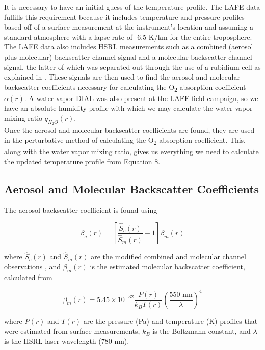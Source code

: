 \documentclass[twoside]{article}
\begin{document}
It is necessary to have an initial guess of the temperature profile.
The LAFE data fulfills this requirement because it includes temperature and pressure profiles based off of a surface measurement at the instrument's location and assuming a standard atmosphere with a lapse rate of -6.5 K/km for the entire troposphere.
The LAFE data also includes HSRL measurements such as a combined (aerosol plus molecular) backscatter channel signal and a molecular backscatter channel signal, the latter of which was separated out through the use of a rubidium cell as explained in \citet{Hayman2017}.
These signals are then used to find the aerosol and molecular backscatter coefficients necessary for calculating the O\textsubscript{2} absorption coefficient $\alpha(r)$. 
A water vapor DIAL was also present at the LAFE field campaign, so we have an absolute humidity profile with which we may calculate the water vapor mixing ratio $q_{H_2O}(r)$.\\
\noindent Once the aerosol and molecular backscatter coefficients are found, they are used in the perturbative method of calculating the O\textsubscript{2} absorption coefficient.
This, along with the water vapor mixing ratio, gives us everything we need to calculate the updated temperature profile from Equation 8.

\subsection{Aerosol and Molecular Backscatter Coefficients}
The aerosol backscatter coefficient is found using \cite{Hayman2017}

\begin{equation}
	\beta_a(r) = \left[ \frac{\hat{S}_c(r)}{\hat{S}_m(r)}-1 \right] \beta_m(r)
\end{equation}

\noindent where $\hat{S}_c(r)$ and $\hat{S}_m(r)$ are the modified combined and molecular channel observations \cite{Hayman2017}, and $\beta_m(r)$ is the estimated molecular backscatter coefficient, calculated from \cite{Measures1984}

\begin{equation}
	\beta_m(r) = 5.45 \times 10^{-32} \frac{P(r)}{k_B T(r)} \left( \frac{550 \text{ nm}}{\lambda} \right) ^4
\end{equation}

\noindent where $P(r)$ and $T(r)$ are the pressure (Pa) and temperature (K) profiles that were estimated from surface measurements, $k_B$ is the Boltzmann constant, and $\lambda$ is the HSRL laser wavelength (780 nm).
\end{document}
